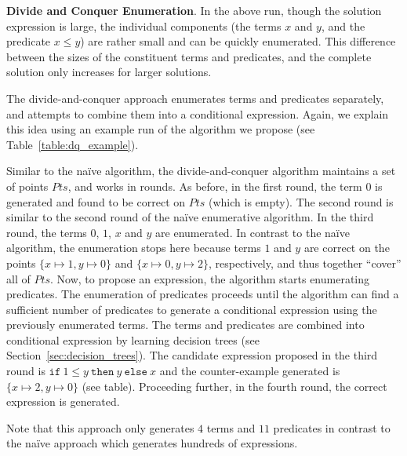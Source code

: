 \documentclass{llncs}
\newcommand\Points{\mathit{Pts}}
\newcommand\ITE[3]{\mathtt{if}~#1~\mathtt{then}~#2~\mathtt{else}~#3}
\renewcommand{\paragraph}[1]{\par\noindent\textbf{#1}.}
\begin{document}
\paragraph{Divide and Conquer Enumeration}
In the above run, though the solution expression is large, the
individual components (the terms $x$ and $y$, and the predicate $x \leq
y$) are rather small and can be quickly enumerated.
This difference between the sizes of the constituent terms and
predicates, and the complete solution only increases for larger
solutions.

The divide-and-conquer approach enumerates terms and predicates
separately, and attempts to combine them into a conditional expression.
Again, we explain this idea using an example run of the algorithm we
propose (see Table~\ref{table:dq_example}).

Similar to the na\"ive algorithm, the divide-and-conquer algorithm
maintains a set of points $\Points$, and works in rounds.
As before, in the first round, the term $0$ is generated and found to be
correct on $\Points$ (which is empty).
The second round is similar to the second round of the na\"ive
enumerative algorithm.
In the third round, the terms $0$, $1$, $x$ and $y$ are enumerated.
In contrast to the na\"ive algorithm, the enumeration stops here because
terms $1$ and $y$ are correct on the points $\{ x \mapsto 1, y \mapsto 0
\}$ and $\{ x \mapsto 0, y \mapsto 2 \}$, respectively, and thus
together ``cover'' all of $\Points$.
Now, to propose an expression, the algorithm starts enumerating
predicates.
The enumeration of predicates proceeds until the algorithm can find
a sufficient number of predicates to generate a conditional expression
using the previously enumerated terms.
The terms and predicates are combined into conditional expression by
learning decision trees (see Section~\ref{sec:decision_trees}).
The candidate expression proposed in the third round is
$\ITE{1 \leq y}{y}{x}$ and the counter-example generated is
$\{ x \mapsto 2, y \mapsto 0 \}$ (see table).
Proceeding further, in the fourth round, the correct expression is
generated.

Note that this approach only generates $4$ terms and $11$ predicates in
contrast to the na\"ive approach which generates hundreds of
expressions.
\end{document}
